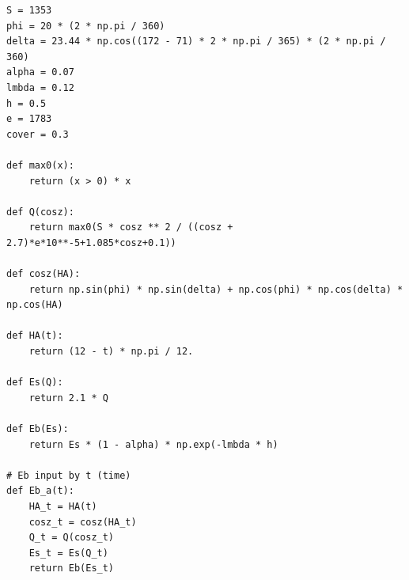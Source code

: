 \documentclass[a4paper]{report}
\begin{document}
\begin{appendices}
\begin{lstlisting}[caption={Q4 code snippet for calculating $E_b(t)$},captionpos=b]
S = 1353
phi = 20 * (2 * np.pi / 360)
delta = 23.44 * np.cos((172 - 71) * 2 * np.pi / 365) * (2 * np.pi / 360)
alpha = 0.07
lmbda = 0.12
h = 0.5
e = 1783
cover = 0.3

def max0(x):
    return (x > 0) * x 

def Q(cosz):
    return max0(S * cosz ** 2 / ((cosz + 2.7)*e*10**-5+1.085*cosz+0.1))

def cosz(HA):
    return np.sin(phi) * np.sin(delta) + np.cos(phi) * np.cos(delta) * np.cos(HA)

def HA(t):
    return (12 - t) * np.pi / 12.

def Es(Q):
    return 2.1 * Q

def Eb(Es):
    return Es * (1 - alpha) * np.exp(-lmbda * h)

# Eb input by t (time)
def Eb_a(t):
    HA_t = HA(t)
    cosz_t = cosz(HA_t)
    Q_t = Q(cosz_t)
    Es_t = Es(Q_t)
    return Eb(Es_t)
\end{lstlisting}
\end{appendices}



\end{document}
